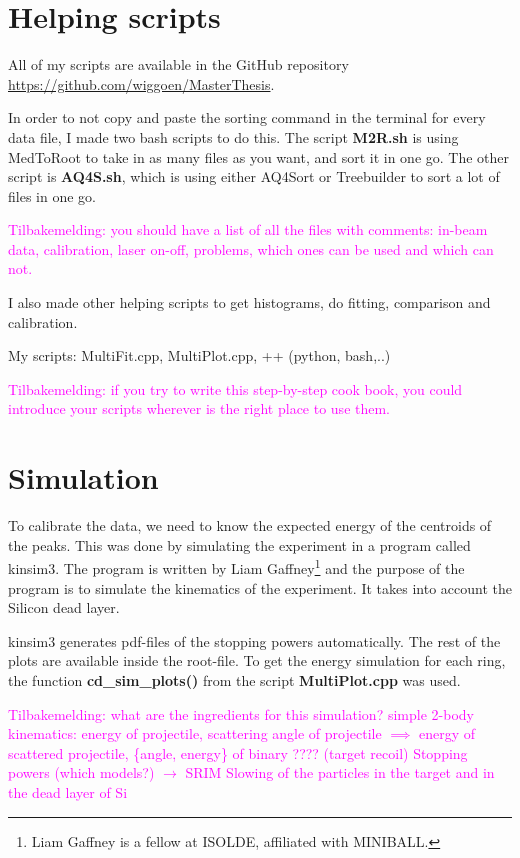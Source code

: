 \documentclass[twoside,english]{uiofysmaster/uiofysmaster}
\begin{document}
\section{Helping scripts}
All of my scripts are available in the GitHub repository \url{https://github.com/wiggoen/MasterThesis}.

In order to not copy and paste the sorting command in the terminal for every data file, I made two bash scripts to do this. The script \textbf{M2R.sh} is using MedToRoot to take in as many files as you want, and sort it in one go. The other script is \textbf{AQ4S.sh}, which is using either AQ4Sort or Treebuilder to sort a lot of files in one go. 

\textcolor{Magenta}{Tilbakemelding: \newline 
you should have a list of all the files with comments: in-beam data, calibration, laser on-off, problems, which ones can be used and which can not.
}

I also made other helping scripts to get histograms, do fitting, comparison and calibration. 

My scripts: MultiFit.cpp, MultiPlot.cpp, ++ (python, bash,..)

\textcolor{Magenta}{Tilbakemelding: \newline 
if you try to write this step-by-step cook book, you could introduce your scripts wherever is the right place to use them. 
}


\section{Simulation}
To calibrate the data, we need to know the expected energy of the centroids of the peaks. 
This was done by simulating the experiment in a program called kinsim3. The program is written by Liam Gaffney\footnote{Liam Gaffney is a fellow at ISOLDE, affiliated with MINIBALL.} and the purpose of the program is to simulate the kinematics of the experiment. 
It takes into account the Silicon dead layer. 

kinsim3 generates pdf-files of the stopping powers automatically. 
The rest of the plots are available inside the root-file. 
To get the energy simulation for each ring, the function \textbf{cd\_sim\_plots()} from the script \textbf{MultiPlot.cpp} was used. 

\textcolor{Magenta}{Tilbakemelding: \newline 
what are the ingredients for this simulation? \newline
simple 2-body kinematics: energy of projectile, scattering angle of projectile $\implies$ energy of scattered projectile, \{angle, energy\} of binary ???? (target recoil) \newline
Stopping powers (which models?) $\rightarrow$ SRIM \newline
Slowing of the particles in the target and in the dead layer of Si
}
\end{document}
